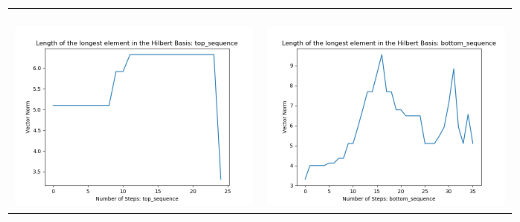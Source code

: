 \documentclass[10pt]{article}
\begin{document}
\begin{tabular}{c|c}
\begin{minipage}{.45\textwidth}
\end{minipage} \\ \\
\hline \\\begin{minipage}{.45\textwidth}
\includegraphics[width=\textwidth]{"DATA/5d/6 generators 2 bound H/top_sequence LENGTH"}
\end{minipage} &
\begin{minipage}{.45\textwidth}
\includegraphics[width=\textwidth]{"DATA/5d/6 generators 2 bound H bottomup/bottom_sequence LENGTH"}
\end{minipage}
\end{tabular}
\end{document}
